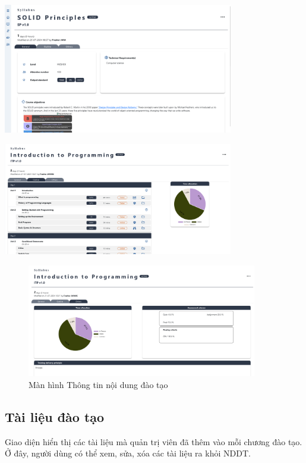 \documentclass[report.tex]{subfiles}
\begin{document}
{\centering
\includegraphics[width=380px]{../meta/ui.syllabus-detail-1.png}
\par
}
{\centering
\includegraphics[width=380px]{../meta/ui.syllabus-detail-2.png}
\par
}
\begin{figure}[!htb]
{\centering
\includegraphics[width=380px]{../meta/ui.syllabus-detail-3.png}
\caption{Màn hình Thông tin nội dung đào tạo}
\par
}
\end{figure}
\FloatBarrier

\subsection{Tài liệu đào tạo}

Giao diện hiển thị các tài liệu mà quản trị viên đã thêm vào mỗi chương đào tạo.
Ở đây, người dùng có thể xem, sửa, xóa các tài liệu ra khỏi NDDT.
\end{document}
